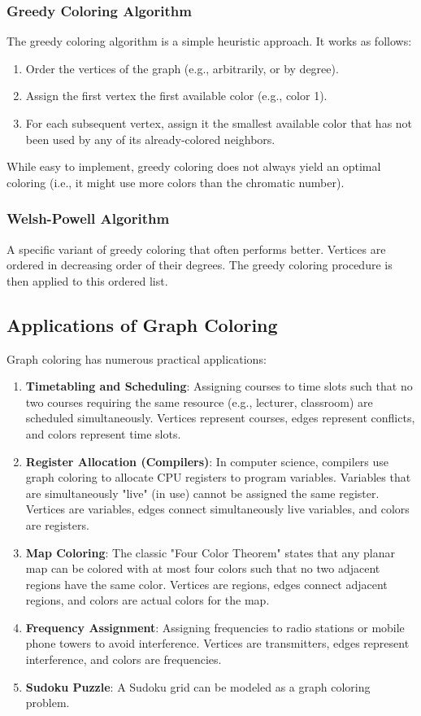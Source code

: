 \documentclass[11pt, a4paper]{article}
\begin{document}
\subsubsection{Greedy Coloring Algorithm}
The greedy coloring algorithm is a simple heuristic approach. It works as follows:
\begin{enumerate}[noitemsep,topsep=3pt,parsep=3pt,partopsep=0pt]
    \item Order the vertices of the graph (e.g., arbitrarily, or by degree).
    \item Assign the first vertex the first available color (e.g., color 1).
    \item For each subsequent vertex, assign it the smallest available color that has not been used by any of its already-colored neighbors.
\end{enumerate}
While easy to implement, greedy coloring does not always yield an optimal coloring (i.e., it might use more colors than the chromatic number).

\subsubsection{Welsh-Powell Algorithm}
A specific variant of greedy coloring that often performs better. Vertices are ordered in decreasing order of their degrees. The greedy coloring procedure is then applied to this ordered list.

\subsection{Applications of Graph Coloring}
Graph coloring has numerous practical applications:

\begin{enumerate}[noitemsep,topsep=3pt,parsep=3pt,partopsep=0pt]
    \item \textbf{Timetabling and Scheduling}: Assigning courses to time slots such that no two courses requiring the same resource (e.g., lecturer, classroom) are scheduled simultaneously. Vertices represent courses, edges represent conflicts, and colors represent time slots.
    \item \textbf{Register Allocation (Compilers)}: In computer science, compilers use graph coloring to allocate CPU registers to program variables. Variables that are simultaneously "live" (in use) cannot be assigned the same register. Vertices are variables, edges connect simultaneously live variables, and colors are registers.
    \item \textbf{Map Coloring}: The classic "Four Color Theorem" states that any planar map can be colored with at most four colors such that no two adjacent regions have the same color. Vertices are regions, edges connect adjacent regions, and colors are actual colors for the map.
    \item \textbf{Frequency Assignment}: Assigning frequencies to radio stations or mobile phone towers to avoid interference. Vertices are transmitters, edges represent interference, and colors are frequencies.
    \item \textbf{Sudoku Puzzle}: A Sudoku grid can be modeled as a graph coloring problem.
\end{enumerate}
\end{document}

